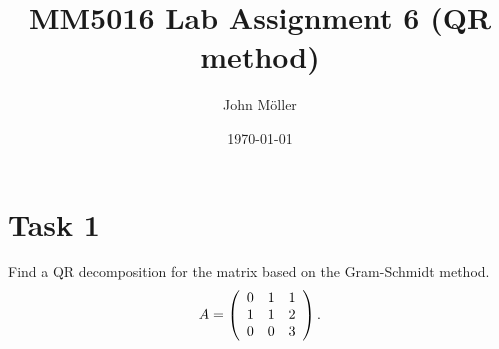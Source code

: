 \documentclass[10pt]{article}
\author{John Möller}
\date{\today}
\title{MM5016 Lab Assignment 6 (QR method)}
\begin{document}
\maketitle

\section{Task 1}
\label{sec:orge141a0b}
\begin{exercise}[1]  \label{exe:1}
Find a QR decomposition for the matrix based on the Gram-Schmidt method.
\begin{align*}
A=
\left( \begin{array}{c c c}
0  &  1  &  1 \\
1  &  1  &  2 \\
0  &  0  &  3
\end{array} \right)
.
\end{align*}

\end{exercise}
\end{document}
